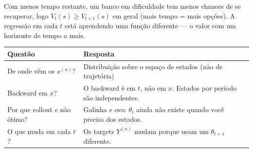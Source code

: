 \documentclass[12pt,a4paper]{article}
\begin{document}
Com menos tempo restante, um banco em dificuldade tem menos chances de se recuperar, logo $V_t(s) \geq V_{t+1}(s)$ em geral (mais tempo = mais opções). A regressão em cada $t$ está aprendendo uma função diferente --- o valor com um horizonte de tempo a mais.

\begin{center}
\begin{tabular}{ll}
\hline
\textbf{Questão} & \textbf{Resposta} \\
\hline
De onde vêm os $x^{(n)}$? & Distribuição sobre o espaço de estados (não de trajetória) \\
Backward em $x$? & O backward é em $t$, não em $x$. Estados por período são independentes. \\
Por que rollout e não ótimo? & Galinha e ovo: $\theta_t$ ainda não existe quando você precisa dos estados. \\
O que muda em cada $t$? & Os targets $Y^{(n)}$ mudam porque usam um $\theta_{t+1}$ diferente. \\
\hline
\end{tabular}
\end{center}
\end{document}
